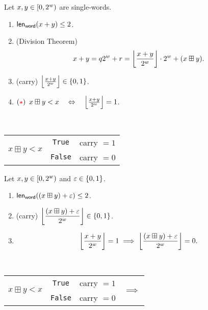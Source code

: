 \begin{tcolorbox}[colframe=procolor,title={\color{white}\bf Single-Word Addition \(x[i]+y[i]\)}]
\begin{proposition}
Let \(x,y\in\intco{0,2^w}\) are single-words. \begin{enumerate}[(1)]
	\item \(\len_\word(x+y)\leq 2\).
	\item (Division Theorem) \[
	x+y=q2^w+r=\floor*{\frac{x+y}{2^w}}\cdot 2^w+(x\boxplus y).
	\]
	\item (carry) \(\floor*{\frac{x+y}{2^w}}\in\set{0,1}\).
	\item $(\textcolor{red}{\star})$ $x\boxplus y < x\quad\Leftrightarrow\quad\floor*{\frac{x+y}{2^w}}=1$.
\end{enumerate}
\end{proposition}
\end{tcolorbox}
\begin{note}
\ \begin{table}[h!]\centering\renewcommand{\arraystretch}{1.25}
\begin{tabular}{c|c|c}\hline
	\multirow{2}{*}{$x\boxplus y < x$} & \texttt{True} & carry $=1$\\ \cline{2-3}
	& \texttt{False} & carry $=0$\\ \hline
\end{tabular}
\end{table}
\end{note}

\begin{tcolorbox}[colframe=procolor,title={\color{white}\bf Single-Word Addition with Carry \(x[i]\boxplus y[i]+\varepsilon\)}]
\begin{proposition}
Let \(x,y\in\intco{0,2^w}\) and \(\varepsilon\in\set{0,1}\). \begin{enumerate}[(1)]
	\item \(\len_\word((x\boxplus y)+\varepsilon)\leq 2\).
	\item (carry) \(\displaystyle\floor*{\frac{(x\boxplus y)+\varepsilon}{2^w}}\in\set{0,1}\).
	\item \[
	\floor*{\frac{x+y}{2^w}}=1
		\implies\floor*{\frac{(x\boxplus y)+\varepsilon}{2^w}}=0.
	\]
\end{enumerate}
\end{proposition}
\end{tcolorbox}
\begin{note}
\ \begin{table}[h!]\centering\renewcommand{\arraystretch}{1.25}
	\begin{tabular}{c|c|c|c|}\hline
		\multirow{2}{*}{$x\boxplus y < x$} & \texttt{True} & carry $=1$ & \multirow{2}{*}{$\implies$}\\ \cline{2-3}
		& \texttt{False} & carry $=0$ & \\ \hline
	\end{tabular}
\end{table}
\end{note}


